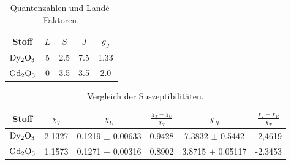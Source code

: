 \begin{table}
  \centering
  \caption{Quantenzahlen und Landé-Faktoren.}
  \begin{tabular}{c c c c c }
    \toprule
    {Stoff} & {$L$} & {$S$} & {$J$} & {$g_J$}\\
    \midrule
    $\ce{Dy2O3}$ & 5 & 2.5 & 7.5 & 1.33\\
    $\ce{Gd2O3}$ & 0 & 3.5 & 3.5 & 2.0\\
    \bottomrule
  \end{tabular}
\end{table}

\begin{table}
  \centering
  \caption{Vergleich der Suszeptibilitäten.}
  \begin{tabular}{c c c c c c}
    \toprule
    {Stoff} & {$\chi_T$} &{$\chi_U$} & {$\frac{\chi_T - \chi_U}{\chi_T}$} & {$\chi_R$} & {$\frac{\chi_T - \chi_R}{\chi_T}$}\\
    \midrule
    $\ce{Dy2O3}$ & 2.1327 & 0.1219 $\pm$ 0.00633 & 0.9428 & 7.3832 $\pm$ 0.5442&  -2,4619\\
    $\ce{Gd2O3}$ & 1.1573 &  0.1271 $\pm$  0.00316 & 0.8902 &3.8715 $\pm$ 0.05117 & -2.3453 \\
    \bottomrule
  \end{tabular}
\end{table}